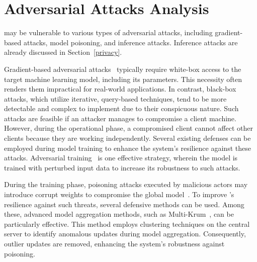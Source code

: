 \section{Adversarial Attacks Analysis}
\label{sec:adversarial}


\Sys may be vulnerable to various types of adversarial attacks, including gradient-based attacks, model poisoning, and inference attacks. Inference attacks are already discussed in Section~\ref{privacy}.

 Gradient-based adversarial attacks~\cite{chakraborty2021survey} typically require white-box access to the target machine learning model, including its parameters. This necessity often renders them impractical for real-world applications. In contrast, black-box attacks, which utilize iterative, query-based techniques, tend to be more detectable and complex to implement due to their conspicuous nature. Such attacks are feasible if an attacker manages to compromise a client machine. However, during the operational phase, a compromised client cannot affect other clients because they are working independently. Several existing defenses can be employed during model training to enhance the system's resilience against these attacks. Adversarial training~\cite{tramer2019adversarial} is one effective strategy, wherein the model is trained with perturbed input data to increase its robustness to such attacks.

 During the training phase, poisoning attacks executed by malicious actors may introduce corrupt weights to compromise the global model~\cite{jagielski2018manipulating}. To improve \Sys's resilience against such threats, several defensive methods can be used. Among these, advanced model aggregation methods, such as Multi-Krum~\cite{munoz2019byzantine}, can be particularly effective. This method employs clustering techniques on the central server to identify anomalous updates during model aggregation. Consequently, outlier updates are removed, enhancing the system's robustness against poisoning.

 
